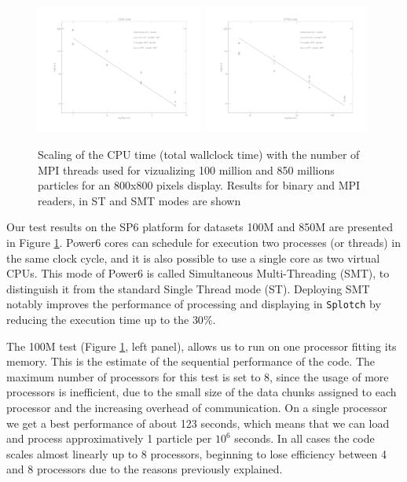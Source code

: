 \begin{figure}
\begin{center}
\includegraphics[width=0.49\textwidth]{bench100M_r.pdf}
\includegraphics[width=0.49\textwidth]{bench870M_r.pdf}
\end{center}
\caption{Scaling of the CPU time (total wallclock time) with the number of MPI threads 
used for vizualizing 100 million
and 850 millions particles for an 800x800 pixels display.
Results for binary and MPI readers, in ST and SMT modes are shown}\label{mpi100M}
\end{figure}

Our test results on the SP6 platform for datasets 100M and 850M 
are presented in Figure \ref{mpi100M}.
Power6 cores can schedule for execution two processes (or threads) in the same clock cycle, 
and it is also possible to use a single core as two virtual CPUs. This mode of Power6 
is called Simultaneous Multi-Threading (SMT), to distinguish it from 
the standard Single Thread mode (ST).
Deploying SMT notably improves the performance 
of processing and displaying in {\tt Splotch} by reducing the execution time up to  
the $30\%$. 

The 100M test (Figure \ref{mpi100M}, left panel), allows us 
to run on one processor fitting its memory. 
This is the estimate of the sequential performance of the code. 
The maximum number of processors for this test is set to 8, since the usage of 
more processors is inefficient, due to the small size 
of the data chunks assigned to each processor and the increasing overhead of communication.
On a single processor we get a best performance of about 123 seconds, which means that 
we can load and process approximatively 1 particle per $10^6$ seconds. 
In all cases the code scales almost linearly up to 8 processors, beginning to lose
efficiency between 4 and 8 processors due to the reasons previously explained. 

